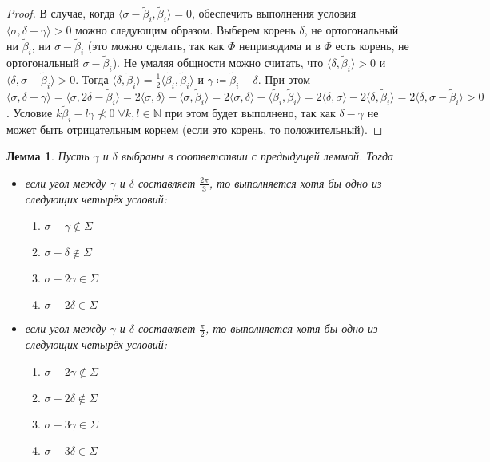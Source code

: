 \documentclass[12pt]{matmex-diploma}
\theoremstyle{mystyleni}
\theoremstyle{mystyle}
\newtheorem{lm}{Лемма}
\newcommand{\N}{\mathbb{N}}
\begin{document}
\begin{proof}
В случае, когда $\langle\sigma-\widetilde\beta_i,\widetilde\beta_i\rangle=0$, обеспечить выполнения условия $\langle\sigma,\delta-\gamma\rangle>0$ можно следующим образом. Выберем корень $\delta$, не ортогональный ни $\widetilde\beta_i$, ни $\sigma-\widetilde\beta_i$ (это можно сделать, так как $\Phi$ неприводима и в $\Phi$ есть корень, не ортогональный $\sigma-\widetilde\beta_i$). Не умаляя общности можно считать, что $\langle\delta,\widetilde\beta_i\rangle>0$ и $\langle\delta,\sigma-\widetilde\beta_i\rangle>0$. Тогда $\langle\delta,\widetilde\beta_i\rangle=\frac{1}{2}\langle\widetilde\beta_i,\widetilde\beta_i\rangle$ и $\gamma\coloneqq\widetilde\beta_i-\delta$. При этом
$\langle\sigma,\delta-\gamma\rangle =
\langle\sigma,2\delta-\widetilde\beta_i\rangle =
2\langle\sigma,\delta\rangle-\langle\sigma,\widetilde\beta_i\rangle = 
2\langle\sigma,\delta\rangle-\langle\widetilde\beta_i,\widetilde\beta_i\rangle =
2\langle\delta,\sigma\rangle-2\langle\delta,\widetilde\beta_i\rangle =
2\langle\delta,\sigma-\widetilde\beta_i\rangle > 0$.
Условие $k\widetilde\beta_i-l\gamma\nprec 0\;\forall k,l\in\N$ при этом будет выполнено, так как  $\delta-\gamma$ не может быть отрицательным корнем (если это корень, то положительный).
\end{proof}

\begin{lm}\label{highestweightvariants}
Пусть $\gamma$ и $\delta$ выбраны в соответствии с предыдущей леммой. Тогда
\begin{itemize}[label={\LARGE\raisebox{-0.4ex}{\textbullet}\;},leftmargin=2\parindent]
\item если угол между $\gamma$ и $\delta$ составляет $\frac{2\pi}{3}$, то выполняется хотя бы одно из следующих четырёх условий:
\begin{enumerate}
\item $ \sigma - \gamma \notin \Sigma$
\item $ \sigma - \delta \notin \Sigma$
\item $ \sigma - 2\gamma \in \Sigma$
\item $ \sigma - 2\delta \in \Sigma$
\end{enumerate}
\item если угол между $\gamma$ и $\delta$ составляет $\frac{\pi}{2}$, то выполняется хотя бы одно из следующих четырёх условий:
\begin{enumerate}
\item $ \sigma - 2\gamma \notin \Sigma$
\item $ \sigma - 2\delta \notin \Sigma$
\item $ \sigma - 3\gamma \in \Sigma$
\item $ \sigma - 3\delta \in \Sigma$
\end{enumerate}
\end{itemize}
\end{lm}
\pagebreak
\end{document}

